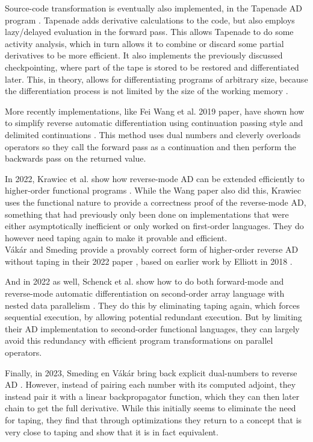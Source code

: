         Source-code transformation is eventually also implemented, in the Tapenade AD program \cite{hascoet2013tapenade}.
        Tapenade adds derivative calculations to the code, but also employs lazy/delayed evaluation in the forward pass.
        This allows Tapenade to do some activity analysis, which in turn allows it to combine or discard some partial derivatives to be more efficient.
        It also implements the previously discussed checkpointing, where part of the tape is stored to be restored and differentiated later.
        This, in theory, allows for differentiating programs of arbitrary size, because the differentiation process is not limited by the size of the working memory \cite{griewank2008evaluating}.

        More recently implementations, like Fei Wang et al. 2019 paper, have shown how to simplify reverse automatic differentiation using continuation passing style and delimited continuations \cite{wang2019demystifying}.
        This method uses dual numbers and cleverly overloads operators so they call the forward pass as a continuation and then perform the backwards pass on the returned value.

        In 2022, Krawiec et al. show how reverse-mode AD can be extended efficiently to higher-order functional programs \cite{krawiec2022provably}.
        While the Wang paper also did this, Krawiec uses the functional nature to provide a correctness proof of the reverse-mode AD, something that had previously only been done on implementations that were either asymptotically inefficient or only worked on first-order languages.
        They do however need taping again to make it provable and efficient.\\
        Vákár and Smeding provide a provably correct form of higher-order reverse AD without taping in their 2022 paper \cite{vakar2022chad}, based on earlier work by Elliott in 2018 \cite{elliott2018simple}.

        And in 2022 as well, Schenck et al. show how to do both forward-mode and reverse-mode automatic differentiation on second-order array language with nested data parallelism \cite{schenck2022ad}.
        They do this by eliminating taping again, which forces sequential execution, by allowing potential redundant execution.
        But by limiting their AD implementation to second-order functional languages, they can largely avoid this redundancy with efficient program transformations on parallel operators.

        Finally, in 2023, Smeding en Vákár bring back explicit dual-numbers to reverse AD \cite{smeding2023efficient}.
        However, instead of pairing each number with its computed adjoint, they instead pair it with a linear backpropagator function, which they can then later chain to get the full derivative.
        While this initially seems to eliminate the need for taping, they find that through optimizations they return to a concept that is very close to taping and show that it is in fact equivalent.

